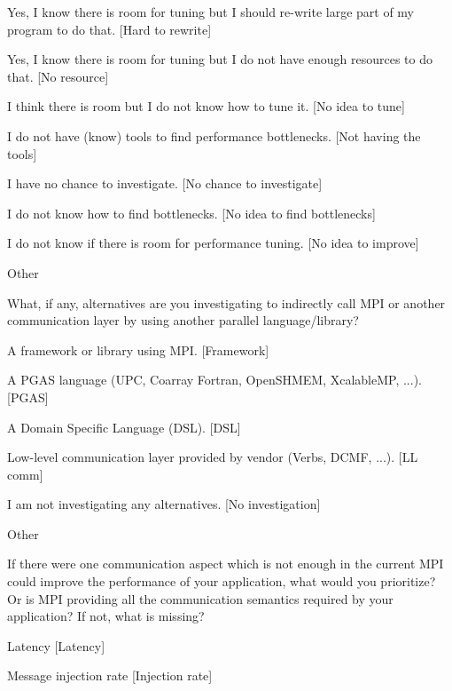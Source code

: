 \documentclass[preprint,5p,times]{elsarticle}
\begin{document}
{{\begin{description}
\begin{inparaenum}[{\bf C}1)]
    \item Yes, I know there is room for tuning but I should re-write large
      part of my program to do that. [Hard to rewrite]
    \item Yes, I know there is room for tuning but I do not have enough resources to do that.
      [No resource]
    \item I think there is room but I do not know how to tune it.
      [No idea to tune]
    \item I do not have (know) tools to find performance bottlenecks.
      [Not having the tools]
    \item I have no chance to investigate.
      [No chance to investigate]
    \item I do not know how to find bottlenecks.
      [No idea to find bottlenecks]
    \item I do not know if there is room for performance tuning.
      [No idea to improve]
    \item Other
    \end{inparaenum}
  \item[Q24*:] What, if any, alternatives are you investigating to
    indirectly call MPI or another communication layer by using another
    parallel language/library?
    \begin{inparaenum}[{\bf C}1)]
    \item A framework or library using MPI. [Framework]
    \item A PGAS language (UPC, Coarray Fortran, OpenSHMEM, XcalableMP,
      ...). [PGAS]
    \item A Domain Specific Language (DSL). [DSL]
    \item Low-level communication layer provided by vendor (Verbs, DCMF,
      ...). [LL comm]
    \item I am not investigating any alternatives. [No investigation]
    \item Other
    \end{inparaenum}
  \item[Q25:] If there were one communication aspect which is not enough
    in the current MPI could improve the performance of your application,
    what would you prioritize? Or is MPI providing all the communication
    semantics required by your application? If not, what is missing?
    \begin{inparaenum}[{\bf C}1)]
    \item Latency [Latency]
    \item Message injection rate [Injection rate]

\end{inparaenum}
\end{description}}}
\end{document}
